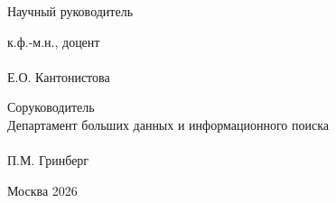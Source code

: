 \begin{titlepage}
\vspace{0.9cm}

\noindent Научный руководитель

\vspace{-0.2cm}

\begin{flushright}
к.ф.-м.н., доцент\\
\makebox[6cm]{\hrulefill}\\
Е.О. Кантонистова
\end{flushright}

\vspace{0.45cm}

\begin{flushright}
Соруководитель\\
Департамент больших данных и информационного поиска\\
\makebox[6cm]{\hrulefill}\\
П.М. Гринберг
\end{flushright}

\vspace{\fill}

\begin{center}
Москва 2026
\end{center}

\end{titlepage}
